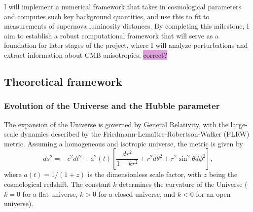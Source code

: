 \documentclass{aa}
\begin{document}
I will implement a numerical framework that takes in cosmological parameters and computes such key background quantities, and use this to fit to measurements of supernova luminosity distances. By completing this milestone, I aim to establish a robust computational framework that will serve as a foundation for later stages of the project, where I will analyze perturbations and extract information about CMB anisotropies. \colorbox{Plum}{correct?}

\subsection{Theoretical framework}\label{subsec: I theory}
\subsubsection{Evolution of the Universe and the Hubble parameter}
The expansion of the Universe is governed by General Relativity, with the large-scale dynamics described by the Friedmann-Lemaître-Robertson-Walker (FLRW) metric. Assuming a homogeneous and isotropic universe, the metric is given by
\begin{equation}
    ds^2 = -c^2 dt^2 + a^2(t) \left[ \frac{dr^2}{1 - k r^2} + r^2 d\theta^2 + r^2 \sin^2\theta d\phi^2 \right],
\end{equation}
where $a(t) = 1/(1+z)$ is the dimensionless scale factor, with $z$ being the cosmological redshift. The constant $k$ determines the curvature of the Universe ($k = 0$ for a flat universe, $k > 0$ for a closed universe, and $k < 0$ for an open universe). 
\end{document}
